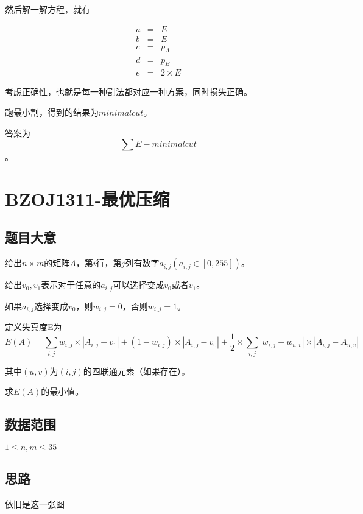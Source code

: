 \documentclass{ctexart}
\numberwithin{equation}{section}
\begin{document}
\begin{flushleft}
   然后解一解方程，就有

   \begin{eqnarray*} 
    a &=& E\\
    b &=& E\\
    c &=& p_A\\
    d &=& p_B\\
    e &=& 2\times E
   \end{eqnarray*}

   考虑正确性，也就是每一种割法都对应一种方案，同时损失正确。

   跑最小割，得到的结果为$minimalcut$。

   答案为$$\sum E-minimalcut$$。

   \newpage

   \section{BZOJ1311-最优压缩}
  \subsection{题目大意}
  给出$n\times m$的矩阵$A$，第$i$行，第$j$列有数字$a_{i,j}(a_{i,j}\in [0,255])$。

  给出$v_0,v_1$表示对于任意的$a_{i,j}$可以选择变成$v_0$或者$v_1$。

  如果$a_{i,j}$选择变成$v_0$，则$w_{i,j}=0$，否则$w_{i,j}=1$。

  定义失真度E为
  $$E(A)=\sum_{i,j}w_{i,j}\times |A_{i,j}-v_1|+(1-w_{i,j})\times |A_{i,j}-v_0|+\frac{1}{2}\times \sum_{i,j}|w_{i,j}-w_{u,v}|\times |A_{i,j}-A_{u,v}|$$

  其中$(u,v)$为$(i,j)$的四联通元素（如果存在）。

  求$E(A)$的最小值。
  
  \subsection{数据范围}
  $1\le n,m \le 35$

  \newpage
  
  \subsection{思路}
  依旧是这一张图

  \begin{figure}[htb]        
  \end{figure}


\end{flushleft}
\end{document}
